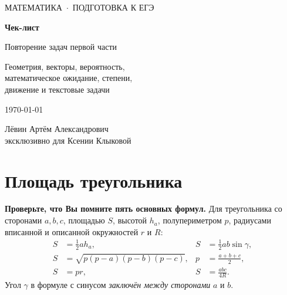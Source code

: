 \documentclass[a4paper,12pt]{article}
\newcommand{\key}[1]{\textbf{\color{accentdark}#1}}
\begin{document}
\begin{titlepage}
\thispagestyle{empty}
\begin{center}
\vspace*{33mm}
{\color{accent}\large МАТЕМАТИКА \,$\cdot$\, ПОДГОТОВКА К ЕГЭ}\par
\vspace{17mm}
{\fontsize{29}{35}\selectfont\bfseries Чек-лист}\par
\vspace{10mm}
{\fontsize{19}{26}\selectfont Повторение задач первой части}\par
\vspace{7mm}
{\large Геометрия, векторы, вероятность,\\ математическое ожидание, степени,\\ движение и текстовые задачи}\par
\vspace{26mm}
{\color{muted}\large \today}\par
\vfill
{\color{accentdark}\normalsize Лёвин Артём Александрович\\[2mm] эксклюзивно для Ксении Клыковой}\par
\vspace{18mm}
\end{center}
\end{titlepage}

\section{Площадь треугольника}
\key{Проверьте, что Вы помните пять основных формул.}
Для треугольника со сторонами $a,b,c$, площадью $S$, высотой $h_a$, полупериметром $p$, радиусами вписанной и описанной окружностей $r$ и $R$:
\[
\begin{aligned}
 S&=\tfrac12 a h_a, &
 S&=\tfrac12 ab\sin\gamma,\\[2pt]
 S&=\sqrt{p(p-a)(p-b)(p-c)}, &
 p&=\tfrac{a+b+c}{2},\\[2pt]
 S&=pr, &
 S&=\tfrac{abc}{4R}.
\end{aligned}
\]
Угол $\gamma$ в формуле с синусом \emph{заключён между сторонами} $a$ и $b$.
\end{document}

